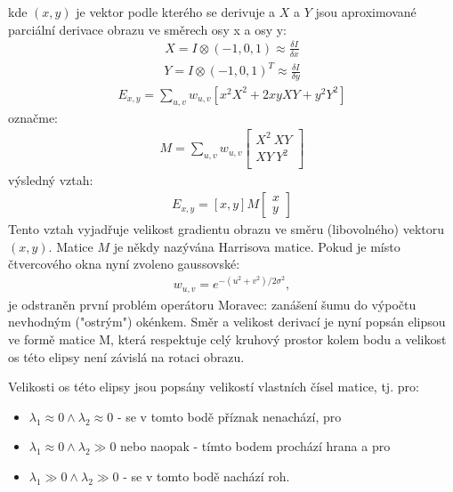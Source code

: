 kde $(x,y)$ je vektor podle kterého se derivuje a $X$ a $Y$ jsou aproximované parciální derivace obrazu ve směrech osy x a osy y:
\begin{align}
X = I \otimes (-1, 0, 1) \approx \frac{\delta I}{\delta x}
\end{align}
\begin{align}
Y = I \otimes (-1, 0, 1)^T \approx \frac{\delta I}{\delta y}
\end{align}
\begin{align}
E_{x,y} = \sum_{u,v} w_{u,v} [x^2X^2 + 2xyXY + y^2Y^2]
\end{align}
označme:
\begin{align}
M = \sum_{u,v} w_{u,v} 
\begin{bmatrix}
X^2  \  XY \\
XY    \ Y^2 \\
\end{bmatrix}
\end{align}
výsledný vztah:
\begin{align}
E_{x,y} = [x, y] M \begin{bmatrix} x \\ y \end{bmatrix}
\end{align}
Tento vztah vyjadřuje velikost gradientu obrazu ve směru (libovolného) vektoru $(x,y)$. Matice $M$ je někdy nazývána Harrisova matice.
Pokud je místo čtvercového okna nyní zvoleno gaussovské:
\begin{align}
w_{u,v} = e^{-(u^2 + v^2)/2\sigma^2},
\end{align}
je odstraněn první problém operátoru Moravec: zanášení šumu do výpočtu nevhodným ("ostrým") okénkem. Směr a velikost derivací je nyní popsán elipsou ve formě matice M, která respektuje celý kruhový prostor kolem bodu a velikost os této elipsy není závislá na rotaci obrazu. 

Velikosti os této elipsy jsou popsány velikostí vlastních čísel matice, tj. pro:

\begin{itemize}
	\item ${\lambda_1 \approx 0 \wedge \lambda_2 \approx 0}$ - se v tomto bodě příznak nenachází, pro
	\item ${\lambda_1 \approx 0 \wedge \lambda_2 \gg 0}$ nebo naopak - tímto bodem prochází hrana a pro
	\item ${\lambda_1 \gg 0 \wedge \lambda_2 \gg 0}$  - se v tomto bodě nachází roh.
\end{itemize}

